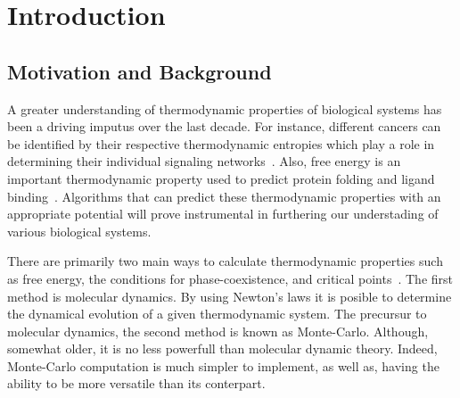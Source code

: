 \documentclass[letterpaper,twocolumn,amsmath,amssymb,pre,aps,10pt]{revtex4-1}
\begin{document}




\section{Introduction}

\subsection{Motivation and Background}

A greater understanding of thermodynamic properties of biological systems has been
a driving imputus over the last decade.  For instance, different cancers can be 
identified by their respective thermodynamic entropies which play a role in determining
their individual signaling networks~\cite{rietman2016thermodynamic}.  Also, free 
energy is an important thermodynamic property used to predict protein folding
and ligand binding~\cite{perez2016advances}.  Algorithms that can predict these
thermodynamic properties with an appropriate potential will prove instrumental in
furthering our understading of various biological systems.   

There are primarily two main ways to calculate thermodynamic properties such as 
free energy, the conditions for phase-coexistence, and critical 
points~\cite{haber2014transition}.  The first method is molecular dynamics. 
By using Newton's laws it is posible to determine the dynamical evolution of a
given thermodynamic system.
The precursur to molecular dynamics, the second method is known as Monte-Carlo.  
Although, somewhat older, it is no less powerfull than molecular dynamic theory.  
Indeed, Monte-Carlo computation is much simpler to implement, as well as, having 
the ability to be more versatile than its conterpart.
\end{document}
